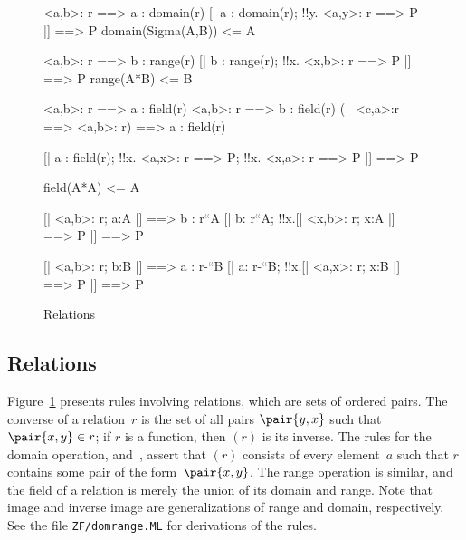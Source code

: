 
\begin{figure}
\begin{ttbox}
        <a,b>: r ==> a : domain(r)
        [| a : domain(r);  !!y. <a,y>: r ==> P |] ==> P
  domain(Sigma(A,B)) <= A

         <a,b>: r ==> b : range(r)
         [| b : range(r);  !!x. <x,b>: r ==> P |] ==> P
   range(A*B) <= B

        <a,b>: r ==> a : field(r)
        <a,b>: r ==> b : field(r)
        (~ <c,a>:r ==> <a,b>: r) ==> a : field(r)

         [| a : field(r);  
                  !!x. <a,x>: r ==> P;  
                  !!x. <x,a>: r ==> P      
               |] ==> P

   field(A*A) <= A

         [| <a,b>: r;  a:A |] ==> b : r``A
         [| b: r``A;  !!x.[| <x,b>: r;  x:A |] ==> P |] ==> P

        [| <a,b>: r;  b:B |] ==> a : r-``B
        [| a: r-``B;  !!x.[| <a,x>: r;  x:B |] ==> P |] ==> P
\end{ttbox}
\caption{Relations} \label{ZF-domrange}
\end{figure}


\subsection{Relations}
Figure~\ref{ZF-domrange} presents rules involving relations, which are sets
of ordered pairs.  The converse of a relation~$r$ is the set of all pairs
$\pair{y,x}$ such that $\pair{x,y}\in r$; if $r$ is a function, then
{$(r)$} is its inverse.  The rules for the domain
operation,  and~, assert that
$(r)$ consists of every element~$a$ such that $r$ contains
some pair of the form~$\pair{x,y}$.  The range operation is similar, and
the field of a relation is merely the union of its domain and range.  Note
that image and inverse image are generalizations of range and domain,
respectively.  See the file
{\tt ZF/domrange.ML} for derivations of the rules.



